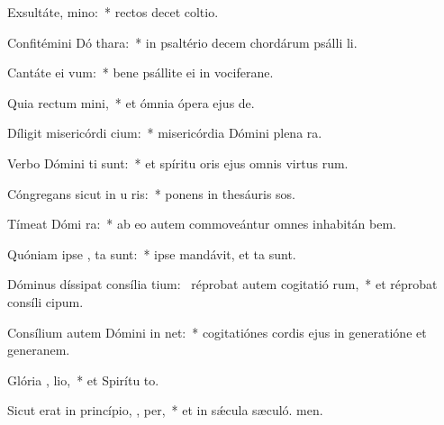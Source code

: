 \item Exsultáte,   mino:~* rectos decet coltio.
\item Confitémini Dó  thara:~* in psaltério decem chordárum psálli li.
\item Cantáte ei  vum:~* bene psállite ei in vociferane.
\item Quia rectum   mini,~* et ómnia ópera ejus  de.
\item Díligit misericórdi  cium:~* misericórdia Dómini plena  ra.
\item Verbo Dómini  ti sunt:~* et spíritu oris ejus omnis virtus rum.
\item Cóngregans sicut in u  ris:~* ponens in thesáuris sos.
\item Tímeat Dómi  ra:~* ab eo autem commoveántur omnes inhabitán bem.
\item Quóniam ipse ,  ta sunt:~* ipse mandávit, et ta sunt.
\item Dóminus díssipat consília tium:~\pscross{} réprobat autem cogitatió rum,~* et réprobat consíli cipum.
\item Consílium autem Dómini in  net:~* cogitatiónes cordis ejus in generatióne et generanem.
\item Glória ,  lio,~* et Spirítu to.
\item Sicut erat in princípio,  ,  per,~* et in sǽcula sæculó. men.
